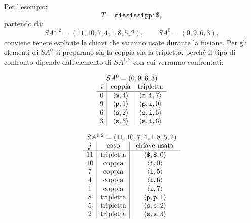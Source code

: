 \documentclass{article}
\theoremstyle{definition}
\numberwithin{equation}{section}
\begin{document}
Per l'esempio:
\[
    T=\texttt{mississippi\$},
\]
partendo da:
\[
    SA^{1,2}=(11,10,7,4,1,8,5,2),
    \qquad
    SA^0=(0,9,6,3),
\]
conviene tenere esplicite le chiavi che saranno usate durante la fusione. Per gli elementi di $SA^0$ si preparano sia la coppia sia la tripletta, perché il tipo di confronto dipende dall'elemento di $SA^{1,2}$ con cui verranno confrontati:

\begin{table}[htpb]
    \centering
    \small
    \begin{minipage}{0.44\textwidth}
        \centering
        \[
            \begin{array}{c|c|c}
                \multicolumn{3}{c}{SA^0=(0,9,6,3)}                                       \\
                i & \text{coppia}               & \text{tripletta}                       \\ \hline
                0 & \langle \texttt{m},4\rangle & \langle \texttt{m},\texttt{i},7\rangle \\
                9 & \langle \texttt{p},1\rangle & \langle \texttt{p},\texttt{i},0\rangle \\
                6 & \langle \texttt{s},2\rangle & \langle \texttt{s},\texttt{i},5\rangle \\
                3 & \langle \texttt{s},3\rangle & \langle \texttt{s},\texttt{i},6\rangle
            \end{array}
        \]
    \end{minipage}
    \hfill
    \begin{minipage}{0.52\textwidth}
        \centering
        \[
            \begin{array}{c|c|c}
                \multicolumn{3}{c}{SA^{1,2}=(11,10,7,4,1,8,5,2)}                 \\
                j  & \text{caso}      & \text{chiave usata}                      \\ \hline
                11 & \text{tripletta} & \langle \texttt{\$},\texttt{\$},0\rangle \\
                10 & \text{coppia}    & \langle \texttt{i},0\rangle              \\
                7  & \text{coppia}    & \langle \texttt{i},5\rangle              \\
                4  & \text{coppia}    & \langle \texttt{i},6\rangle              \\
                1  & \text{coppia}    & \langle \texttt{i},7\rangle              \\
                8  & \text{tripletta} & \langle \texttt{p},\texttt{p},1\rangle   \\
                5  & \text{tripletta} & \langle \texttt{s},\texttt{s},2\rangle   \\
                2  & \text{tripletta} & \langle \texttt{s},\texttt{s},3\rangle
            \end{array}
        \]
    \end{minipage}
    \caption{Chiavi locali usate nella fusione tra $SA^0$ e $SA^{1,2}$ per $T=\texttt{mississippi\$}$.}
    \label{tab:dc3_merge_keys_mississippi}
\end{table}
\end{document}
